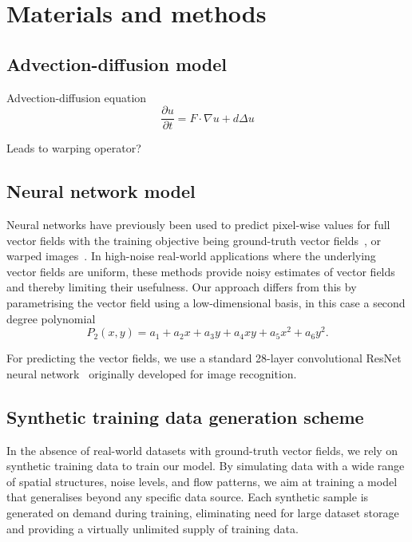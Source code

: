 \documentclass[a4paper,12pt]{article}
\begin{document}
\section{Materials and methods}
\subsection{Advection-diffusion model}
Advection-diffusion equation
\begin{equation}
    \frac{\partial u}{\partial t} = F \cdot \nabla u + d \Delta u
\end{equation}

Leads to warping operator?


\subsection{Neural network model}
Neural networks have previously been used to predict pixel-wise values for full vector fields with the training objective being ground-truth vector fields~\cite{ofnn}, or warped images~\cite{debezenac}.
In high-noise real-world applications where the underlying vector fields are uniform, these methods provide noisy estimates of vector fields and thereby limiting their usefulness.
Our approach differs from this by parametrising the vector field using a low-dimensional basis, in this case a second degree polynomial
\begin{equation}
    P_2(x,y) = a_1 + a_2x + a_3y + a_4xy + a_5x^2+a_6y^2.
\end{equation}

For predicting the vector fields, we use a standard 28-layer convolutional ResNet neural network~\cite{resnet} originally developed for image recognition.

\subsection{Synthetic training data generation scheme}
In the absence of real-world datasets with ground-truth vector fields, we rely on synthetic training data to train our model.
By simulating data with a wide range of spatial structures, noise levels, and flow patterns, we aim at training a model that generalises beyond any specific data source.
Each synthetic sample is generated on demand during training, eliminating need for large dataset storage and providing a virtually unlimited supply of training data.
\end{document}
